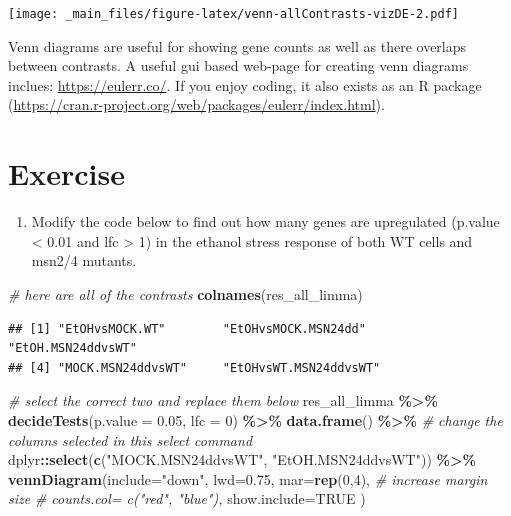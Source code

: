 \documentclass[
]{book}
\newenvironment{Shaded}{\begin{snugshade}}{\end{snugshade}}
\newcommand{\AttributeTok}[1]{\textcolor[rgb]{0.13,0.29,0.53}{#1}}
\newcommand{\CommentTok}[1]{\textcolor[rgb]{0.56,0.35,0.01}{\textit{#1}}}
\newcommand{\ConstantTok}[1]{\textcolor[rgb]{0.56,0.35,0.01}{#1}}
\newcommand{\DecValTok}[1]{\textcolor[rgb]{0.00,0.00,0.81}{#1}}
\newcommand{\FloatTok}[1]{\textcolor[rgb]{0.00,0.00,0.81}{#1}}
\newcommand{\FunctionTok}[1]{\textcolor[rgb]{0.13,0.29,0.53}{\textbf{#1}}}
\newcommand{\NormalTok}[1]{#1}
\newcommand{\SpecialCharTok}[1]{\textcolor[rgb]{0.81,0.36,0.00}{\textbf{#1}}}
\newcommand{\StringTok}[1]{\textcolor[rgb]{0.31,0.60,0.02}{#1}}
\providecommand{\tightlist}{%
  \setlength{\itemsep}{0pt}\setlength{\parskip}{0pt}}
\begin{document}
\texttt{[image: \_main\_files/figure-latex/venn-allContrasts-vizDE-2.pdf]}

Venn diagrams are useful for showing gene counts as well as there overlaps between contrasts. A useful gui based web-page for creating venn diagrams inclues: \url{https://eulerr.co/}. If you enjoy coding, it also exists as an R package (\url{https://cran.r-project.org/web/packages/eulerr/index.html}).

\hypertarget{exercise}{%
\section{Exercise}\label{exercise}}

\begin{enumerate}
\def\labelenumi{\arabic{enumi}.}
\tightlist
\item
  Modify the code below to find out how many genes are upregulated (p.value \textless{} 0.01 and \textbar lfc\textbar{} \textgreater{} 1) in the ethanol stress response of both WT cells and msn2/4 mutants.
\end{enumerate}

\begin{Shaded}
\begin{Highlighting}[]
\CommentTok{\# here are all of the contrasts}
\FunctionTok{colnames}\NormalTok{(res\_all\_limma)}
\end{Highlighting}
\end{Shaded}

\begin{verbatim}
## [1] "EtOHvsMOCK.WT"        "EtOHvsMOCK.MSN24dd"   "EtOH.MSN24ddvsWT"    
## [4] "MOCK.MSN24ddvsWT"     "EtOHvsWT.MSN24ddvsWT"
\end{verbatim}

\begin{Shaded}
\begin{Highlighting}[]
\CommentTok{\# select the correct two and replace them below}
\NormalTok{res\_all\_limma }\SpecialCharTok{\%\textgreater{}\%}
  \FunctionTok{decideTests}\NormalTok{(}\AttributeTok{p.value =} \FloatTok{0.05}\NormalTok{, }\AttributeTok{lfc =} \DecValTok{0}\NormalTok{) }\SpecialCharTok{\%\textgreater{}\%}
  \FunctionTok{data.frame}\NormalTok{() }\SpecialCharTok{\%\textgreater{}\%}
  \CommentTok{\# change the columns selected in this select command}
\NormalTok{  dplyr}\SpecialCharTok{::}\FunctionTok{select}\NormalTok{(}\FunctionTok{c}\NormalTok{(}\StringTok{"MOCK.MSN24ddvsWT"}\NormalTok{, }\StringTok{"EtOH.MSN24ddvsWT"}\NormalTok{)) }\SpecialCharTok{\%\textgreater{}\%}
  \FunctionTok{vennDiagram}\NormalTok{(}\AttributeTok{include=}\StringTok{"down"}\NormalTok{,}
              \AttributeTok{lwd=}\FloatTok{0.75}\NormalTok{,}
              \AttributeTok{mar=}\FunctionTok{rep}\NormalTok{(}\DecValTok{0}\NormalTok{,}\DecValTok{4}\NormalTok{), }\CommentTok{\# increase margin size}
              \CommentTok{\# counts.col= c("red", "blue"),}
              \AttributeTok{show.include=}\ConstantTok{TRUE}
\NormalTok{              )}
\end{Highlighting}
\end{Shaded}
\end{document}
